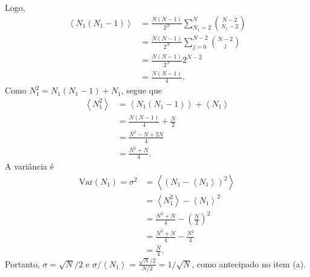 \documentclass[12pt,a4paper]{article}
\newcommand{\avg}[1]{\left\langle #1\right\rangle}
\newcommand{\Var}{\mathrm{Var}}
\begin{document}
%
Logo,
%
\begin{align}
  \avg{N_1(N_1-1)}
  &=\frac{N(N-1)}{2^N}\sum_{N_1=2}^{N}\binom{N-2}{N_1-2}\nonumber\\
  &=\frac{N(N-1)}{2^N}\sum_{j=0}^{N-2}\binom{N-2}{j}\nonumber\\
  &=\frac{N(N-1)}{2^N}2^{N-2}\nonumber\\
  &=\frac{N(N-1)}{4}.
  \label{eq:factorialmoment}
\end{align}
%
Como $N_1^2=N_1(N_1-1)+N_1$, segue que
%
\begin{align}
  \avg{N_1^2}
  &=\avg{N_1(N_1-1)}+\avg{N_1}\nonumber\\
  &=\frac{N(N-1)}{4}+\frac{N}{2}\nonumber\\
  &=\frac{N^2-N+2N}{4}\nonumber\\
  &=\frac{N^2+N}{4}.
  \label{eq:secondmoment}
\end{align}
%
A variância é
%
\begin{align}
  \Var(N_1) = \sigma^2
  &=\avg{(N_1 - \avg{N_1})^2}\nonumber\\
  &=\avg{N_1^2}-\avg{N_1}^2\nonumber\\
  &=\frac{N^2+N}{4}-\left(\frac{N}{2}\right)^2\nonumber\\
  &=\frac{N^2+N}{4}-\frac{N^2}{4}\nonumber\\
  &=\boxed{\frac{N}{4}}.
\end{align}
%
Portanto, $\sigma=\sqrt{N}/2$ e $\sigma/\avg{N_1}= \frac{\sqrt{N}/2}{N/2}= 1/\sqrt{N}$, como antecipado no item (a).
%
\end{document}
